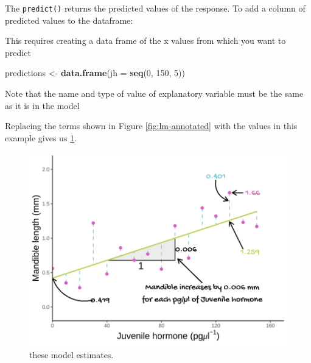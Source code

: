 \documentclass[
]{book}
\newenvironment{Shaded}{\begin{snugshade}}{\end{snugshade}}
\newcommand{\DataTypeTok}[1]{\textcolor[rgb]{0.13,0.29,0.53}{#1}}
\newcommand{\DecValTok}[1]{\textcolor[rgb]{0.00,0.00,0.81}{#1}}
\newcommand{\KeywordTok}[1]{\textcolor[rgb]{0.13,0.29,0.53}{\textbf{#1}}}
\newcommand{\NormalTok}[1]{#1}
\newcommand{\OperatorTok}[1]{\textcolor[rgb]{0.81,0.36,0.00}{\textbf{#1}}}
\newcommand{\StringTok}[1]{\textcolor[rgb]{0.31,0.60,0.02}{#1}}
\begin{document}
The \texttt{predict()} returns the predicted values of the response. To add a column of predicted values to the dataframe:

\begin{Shaded}
\end{Shaded}

This requires creating a data frame of the x values from which you want to predict

\begin{Shaded}
\begin{Highlighting}[]
\NormalTok{predictions <-}\StringTok{ }\KeywordTok{data.frame}\NormalTok{(}\DataTypeTok{jh =} \KeywordTok{seq}\NormalTok{(}\DecValTok{0}\NormalTok{, }\DecValTok{150}\NormalTok{, }\DecValTok{5}\NormalTok{))}
\end{Highlighting}
\end{Shaded}

Note that the name and type of value of explanatory variable must be the same as it is in the model

\begin{Shaded}
\end{Shaded}

Replacing the terms shown in Figure \ref{fig:lm-annotated} with the values in this example gives us \ref{fig:stag-annotated}.



\begin{figure}

\includegraphics[width=0.8\linewidth]{images/fig_5} \hfill{}

\caption{these model estimates.}\label{fig:stag-annotated}
\end{figure}
\end{document}
